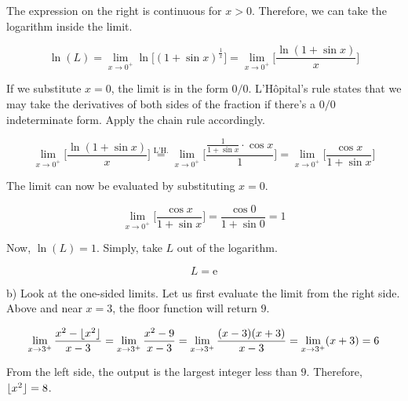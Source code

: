 \documentclass{article}
\DeclarePairedDelimiter\floor{\lfloor}{\rfloor}
\begin{document}
\hfill

\noindent The expression on the right is continuous for $x>0$. Therefore, we can take the logarithm inside the limit.

\begin{equation*}\ln(L) = \lim_{x\to 0^+} \ln\Big[(1+\sin x)^{\frac{1}{x}}\Big] = \lim_{x\to 0^+} \Big[\frac{\ln(1+\sin x)}{x}\Big] \end{equation*}

\hfill

\noindent If we substitute $x=0$, the limit is in the form $0/0$. L'Hôpital's rule states that we may take the derivatives of both sides of the fraction if there's a $0/0$ indeterminate form. Apply the chain rule accordingly.

\begin{equation*}\lim_{x\to 0^+} \Big[\frac{\ln(1+\sin x)}{x}\Big] \overset{\text{L'H.}}{=} \lim_{x\to 0^+} \Big[\frac{\frac{1}{1+\sin x} \cdot \cos x}{1}\Big] = \lim_{x\to 0^+} \Big[\frac{\cos x}{1+\sin x}\Big] \end{equation*}

\hfill

\noindent The limit can now be evaluated by substituting $x=0$.

\begin{equation*}\lim_{x\to 0^+} \Big[\frac{\cos x}{1+\sin x}\Big] = \frac{\cos 0}{1 + \sin 0 } =1\end{equation*}

\hfill

\noindent Now, $\ln(L) = 1$. Simply, take $L$ out of the logarithm.

\begin{equation*} \boxed{L = \mathrm{e}}\end{equation*}

\hfill

\noindent b) Look at the one-sided limits. Let us first evaluate the limit from the right side. Above and near $x=3$, the floor function will return $9$.

\begin{equation*} \lim_{x\to 3^+} \frac{x^2-\floor{x^2}}{x-3} = \lim_{x\to 3^+}\frac{x^2-9}{x-3} = \lim_{x\to 3^+}\frac{(x-3)(x+3)}{x-3} = \lim_{x\to 3^+}(x+3)= 6\end{equation*}

\hfill

\noindent From the left side, the output is the largest integer less than $9$. Therefore, $\floor{x^2} = 8$.
\end{document}
